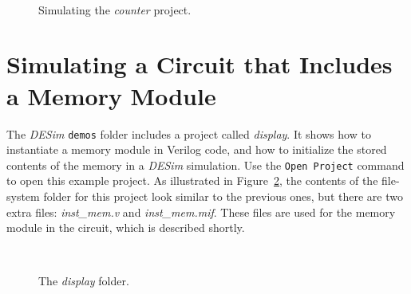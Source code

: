 \documentclass[epsfig,10pt,fullpage]{article} \addtolength{\textwidth}{1.5in}
\begin{document}
~\\
\begin{figure}[h]
	\begin{center}
        \setlength{\fboxsep}{0pt}
	\end{center}
          \caption{Simulating the {\it counter} project.}
	\label{fig:sim2}
\end{figure}

\newpage
\section*{Simulating a Circuit that Includes a Memory Module}

The {\it DESim} \texttt{demos} folder includes a project called {\it display}. It shows how 
to instantiate a memory module in Verilog code, and how to initialize the stored contents of 
the memory in a {\it DESim} simulation.  Use the \texttt{Open Project} command to open this
example project. As illustrated in Figure~\ref{fig:project3}, the
contents of the file-system folder for this project look similar to the previous ones,
but there are two extra files: {\it inst\_mem.v} and {\it inst\_mem.mif}. These files are
used for the memory module in the circuit, which is described shortly.

~\\
\begin{figure}[h]
	\begin{center}
        \setlength{\fboxsep}{0pt}
	\end{center}
		  \caption{The {\it display} folder.}
	\label{fig:project3}
\end{figure}
\end{document}
